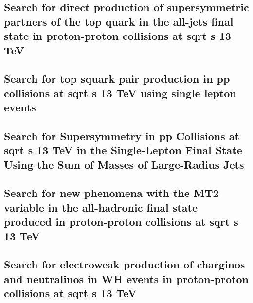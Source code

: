 \documentclass[a4paper, 11pt, twoside, openright]{report}
\begin{document}
\subsection{Search for direct production of supersymmetric partners of the top quark in the all-jets final state in proton-proton collisions at sqrt s 13 TeV}


\subsection{Search for top squark pair production in pp collisions at sqrt s 13 TeV using single lepton events}


\subsection{Search for Supersymmetry in pp Collisions at sqrt s 13 TeV in the Single-Lepton Final State Using the Sum of Masses of Large-Radius Jets}


\subsection{Search for new phenomena with the MT2 variable in the all-hadronic final state produced in proton-proton collisions at sqrt s 13 TeV}


\subsection{Search for electroweak production of charginos and neutralinos in WH events in proton-proton collisions at sqrt s 13 TeV}

\end{document}
